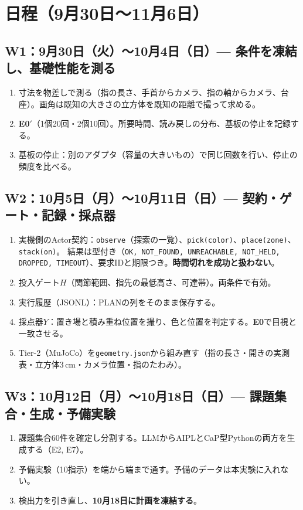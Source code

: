 \documentclass[11pt,a4paper]{article}
\begin{document}
\section{日程（9月30日〜11月6日）}

\subsection*{W1：9月30日（火）〜10月4日（日）— 条件を凍結し、基礎性能を測る}
\begin{enumerate}
\item 寸法を物差しで測る（指の長さ、手首からカメラ、指の軸からカメラ、台座）。画角は既知の大きさの立方体を既知の距離で撮って求める。
\item \textbf{E0$'$}（1個20回・2個10回）。所要時間、読み戻しの分布、基板の停止を記録する。
\item 基板の停止：別のアダプタ（容量の大きいもの）で同じ回数を行い、停止の頻度を比べる。
\end{enumerate}

\subsection*{W2：10月5日（月）〜10月11日（日）— 契約・ゲート・記録・採点器}
\begin{enumerate}
\item 実機側のActor契約：\texttt{observe}（探索の一覧）、\texttt{pick(color)}、\texttt{place(zone)}、\texttt{stack(on)}。
結果は型付き（\texttt{OK, NOT\_FOUND, UNREACHABLE, NOT\_HELD, DROPPED, TIMEOUT}）、要求IDと期限つき。\textbf{時間切れを成功と扱わない}。
\item 投入ゲート$H$（関節範囲、指先の最低高さ、可達帯）。両条件で有効。
\item 実行履歴（JSONL）：PLANの列をそのまま保存する。
\item 採点器$Y$：置き場と積み重ね位置を撮り、色と位置を判定する。\textbf{E0}で目視と一致させる。
\item Tier-2（MuJoCo）を\texttt{geometry.json}から組み直す（指の長さ・開きの実測表・立方体3\,cm・カメラ位置・指のたわみ）。
\end{enumerate}

\subsection*{W3：10月12日（月）〜10月18日（日）— 課題集合・生成・予備実験}
\begin{enumerate}
\item 課題集合60件を確定し分割する。LLMからAIPLとCaP型Pythonの両方を生成する（E2, E7）。
\item 予備実験（10指示）を端から端まで通す。予備のデータは本実験に入れない。
\item 検出力を引き直し、\textbf{10月18日に計画を凍結する}。
\end{enumerate}
\end{document}
